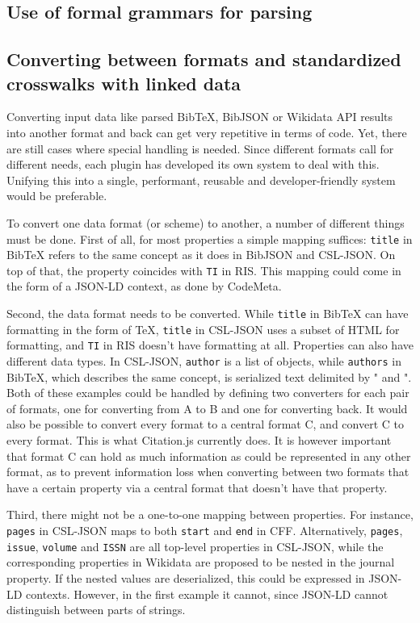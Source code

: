 \documentclass[fleqn,10pt,lineno]{wlpeerj} %
\begin{document}
\subsection*{Use of formal grammars for parsing}


\subsection*{Converting between formats and standardized crosswalks with linked data}

Converting input data like parsed BibTeX, BibJSON or Wikidata API results into another format and back can get very repetitive in terms of code. Yet, there are still cases where special handling is needed. Since different formats call for different needs, each plugin has developed its own system to deal with this. Unifying this into a single, performant, reusable and developer-friendly system would be preferable.

To convert one data format (or scheme) to another, a number of different things must be done. First of all, for most properties a simple mapping suffices: \texttt{title} in BibTeX refers to the same concept as it does in BibJSON and CSL-JSON. On top of that, the property coincides with \texttt{TI} in RIS. This mapping could come in the form of a JSON-LD context, as done by CodeMeta.

Second, the data format needs to be converted. While \texttt{title} in BibTeX can have formatting in the form of \TeX, \texttt{title} in CSL-JSON uses a subset of HTML for formatting, and \texttt{TI} in RIS doesn't have formatting at all. Properties can also have different data types. In CSL-JSON, \texttt{author} is a list of objects, while \texttt{authors} in BibTeX, which describes the same concept, is serialized text delimited by " and ". Both of these examples could be handled by defining two converters for each pair of formats, one for converting from A to B and one for converting back. It would also be possible to convert every format to a central format C, and convert C to every format. This is what Citation.js currently does. It is however important that format C can hold as much information as could be represented in any other format, as to prevent information loss when converting between two formats that have a certain property via a central format that doesn't have that property.

Third, there might not be a one-to-one mapping between properties. For instance, \texttt{pages} in CSL-JSON maps to both \texttt{start} and \texttt{end} in CFF. Alternatively, \texttt{pages}, \texttt{issue}, \texttt{volume} and \texttt{ISSN} are all top-level properties in CSL-JSON, while the corresponding properties in Wikidata are proposed to be nested in the journal property. If the nested values are deserialized, this could be expressed in JSON-LD contexts. However, in the first example it cannot, since JSON-LD cannot distinguish between parts of strings.
\end{document}
